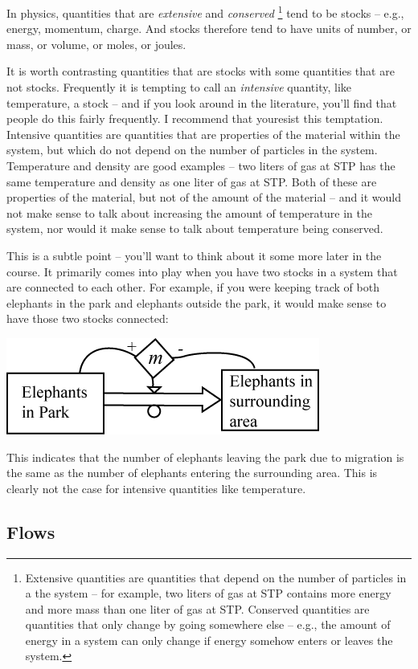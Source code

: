 In physics, quantities that are {\it extensive} and {\it conserved} \footnote{Extensive quantities are quantities that depend on the number of particles in a the system -- for example, two liters of gas at STP contains more energy and more mass than one liter of gas at STP. Conserved quantities are quantities that only change by going somewhere else -- e.g., the amount of energy in a system can only change if energy somehow enters or leaves the system.}  tend to be stocks -- e.g., energy, momentum, charge.  And stocks therefore tend to have units of number, or mass, or volume, or moles, or joules.

It is worth contrasting quantities that are stocks with some quantities that are not stocks.  Frequently it is tempting to call an {\it intensive} quantity, like temperature, a stock -- and if you look around in the literature, you'll find that people do this fairly frequently.  I recommend that youresist this temptation. Intensive quantities are quantities that are properties of the material within the system, but which do not depend on the number of particles in the system.  Temperature and density are good examples -- two liters of gas at STP has the same temperature and density as one liter of gas at STP.  Both of these are properties of the material, but not of the amount of the material -- and it would not make sense to talk about increasing the amount of temperature in the system, nor would it make sense to talk about temperature being conserved.  

This is a subtle point -- you'll want to think about it some more later in the course. It primarily comes into play when you have two stocks in a system that are connected to each other.  For example, if you were keeping track of both elephants in the park and elephants outside the park, it would make sense to have those two stocks connected:

 \centerline{\includegraphics[height=.6in]{figs/TwoStockElephantsExample1}}

This indicates that the number of elephants leaving the park due to migration is the same as the number of elephants entering the surrounding area.    This is clearly not the case for intensive quantities like temperature. 


\subsection{Flows}

